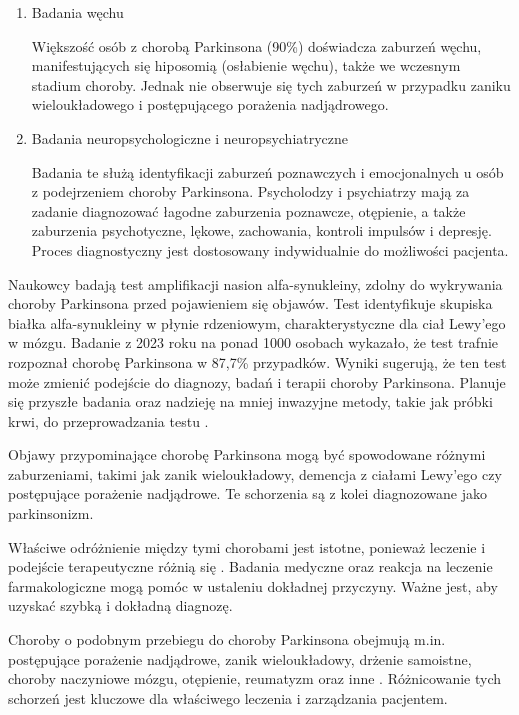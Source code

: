 \begin{enumerate}
	\item Badania węchu

Większość osób z chorobą Parkinsona (90\%) doświadcza zaburzeń węchu, manifestujących się hiposomią (osłabienie węchu), także we wczesnym stadium choroby.
Jednak nie obserwuje się tych zaburzeń w przypadku zaniku wieloukładowego i postępującego porażenia nadjądrowego.

	\item Badania neuropsychologiczne i neuropsychiatryczne

Badania te służą identyfikacji zaburzeń poznawczych i emocjonalnych u osób z podejrzeniem choroby Parkinsona.
Psycholodzy i psychiatrzy mają za zadanie diagnozować łagodne zaburzenia poznawcze, otępienie, a także zaburzenia psychotyczne, lękowe, zachowania, kontroli impulsów i depresję.
Proces diagnostyczny jest dostosowany indywidualnie do możliwości pacjenta.
\end{enumerate}

Naukowcy badają test amplifikacji nasion alfa-synukleiny, zdolny do wykrywania choroby Parkinsona przed pojawieniem się objawów.
Test identyfikuje skupiska białka alfa-synukleiny w płynie rdzeniowym, charakterystyczne dla ciał Lewy'ego w mózgu.
Badanie z 2023 roku na ponad 1000 osobach wykazało, że test trafnie rozpoznał chorobę Parkinsona w 87,7\% przypadków.
Wyniki sugerują, że ten test może zmienić podejście do diagnozy, badań i terapii choroby Parkinsona.
Planuje się przyszłe badania oraz nadzieję na mniej inwazyjne metody, takie jak próbki krwi, do przeprowadzania testu \cite{Mayo_Clinic_PD}.

Objawy przypominające chorobę Parkinsona mogą być spowodowane różnymi zaburzeniami, takimi jak zanik wieloukładowy, demencja z ciałami Lewy'ego czy postępujące porażenie nadjądrowe. Te schorzenia są z kolei diagnozowane jako parkinsonizm.

Właściwe odróżnienie między tymi chorobami jest istotne, ponieważ leczenie i podejście terapeutyczne różnią się \cite{National_Institute_on_Aging_2022}.
Badania medyczne oraz reakcja na leczenie farmakologiczne mogą pomóc w ustaleniu dokładnej przyczyny.
Ważne jest, aby uzyskać szybką i dokładną diagnozę.

Choroby o podobnym przebiegu do choroby Parkinsona obejmują m.in. postępujące porażenie nadjądrowe, zanik wieloukładowy, drżenie samoistne, choroby naczyniowe mózgu, otępienie, reumatyzm oraz inne \cite{diagnostyka_Sitek}.
Różnicowanie tych schorzeń jest kluczowe dla właściwego leczenia i zarządzania pacjentem.

